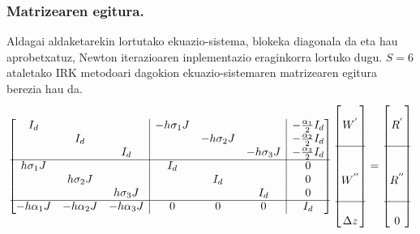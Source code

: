 \subsubsection*{Matrizearen egitura.}

 Aldagai aldaketarekin lortutako ekuazio-sistema, blokeka diagonala da eta hau aprobetxatuz, Newton iterazioaren inplementazio eraginkorra lortuko dugu. $S=6$ ataletako IRK metodoari dagokion ekuazio-sistemaren matrizearen egitura berezia hau da.    
\begin{equation*}
\label{eq:sysmat}
\begin{bmatrix}
 I_d        &             &                     & \multicolumn{1}{|c}{-h\sigma_1 J} &            &                  &\multicolumn{1}{|c}{-\frac{\alpha_1}{2} I_d}\\
            & I_d         &                     & \multicolumn{1}{|c}{}           & -h\sigma_2 J &                
 &\multicolumn{1}{|c}{-\frac{\alpha_2}{2} I_d}\\
            &             & I_d                 & \multicolumn{1}{|c}{}           &            & -h\sigma_3 J  
 &\multicolumn{1}{|c}{-\frac{\alpha_3}{2} I_d}\\\cline{1-7}    
h\sigma_1 J &             &                     & \multicolumn{1}{|c}{I_d}        &            &            
 &\multicolumn{1}{|c}{0}\\
            & h\sigma_2 J &                     & \multicolumn{1}{|c}{}           &  I_d       &             
 &\multicolumn{1}{|c}{0}\\
            &             &  h\sigma_3 J        & \multicolumn{1}{|c}{}           &            &  I_d        
 &\multicolumn{1}{|c}{0}\\\cline{1-7}
 -h\alpha_1 J       & -h\alpha_2 J              &  -h\alpha_3 J                    & \multicolumn{1}{|c}{$0$}        &  $0$       &  $0$         
 &\multicolumn{1}{|c}{ I_d}\\
\end{bmatrix}
\begin{bmatrix}
         \\
 W^{'} \\
    \\
\cline{1-1} \\
    \\
 W^{''}   \\
    \\
    \cline{1-1} \\
 \Delta z  \\
\end{bmatrix}=
\begin{bmatrix}
         \\
 R^{'} \\
    \\
\cline{1-1} \\
    \\
 R^{''}   \\
    \\
    \cline{1-1} \\
 0  \\
\end{bmatrix}
\end{equation*} 
